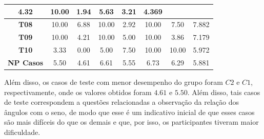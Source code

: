 \begin{table}[htbp]
\begin{tabular}{|c|ccccccc|}
		\multicolumn{1}{c|}{\cellcolor[HTML]{FFFFFF}4.32} &
		\multicolumn{1}{c|}{\cellcolor[HTML]{FFFFFF}10.00} &
		\multicolumn{1}{c|}{\cellcolor[HTML]{FFFFFF}1.94} &
		\multicolumn{1}{c|}{\cellcolor[HTML]{FFFFFF}5.63} &
		\multicolumn{1}{c|}{\cellcolor[HTML]{FFFFFF}3.21} &
		4.369 \\ \hline
		\rowcolor[HTML]{F2F2F2} 
		\textbf{T08} &
		\multicolumn{1}{c|}{\cellcolor[HTML]{F2F2F2}10.00} &
		\multicolumn{1}{c|}{\cellcolor[HTML]{F2F2F2}6.88} &
		\multicolumn{1}{c|}{\cellcolor[HTML]{F2F2F2}10.00} &
		\multicolumn{1}{c|}{\cellcolor[HTML]{F2F2F2}2.92} &
		\multicolumn{1}{c|}{\cellcolor[HTML]{F2F2F2}10.00} &
		\multicolumn{1}{c|}{\cellcolor[HTML]{F2F2F2}7.50} &
		7.882 \\ \hline
		\textbf{T09} &
		\multicolumn{1}{c|}{\cellcolor[HTML]{FFFFFF}10.00} &
		\multicolumn{1}{c|}{\cellcolor[HTML]{FFFFFF}4.21} &
		\multicolumn{1}{c|}{\cellcolor[HTML]{FFFFFF}10.00} &
		\multicolumn{1}{c|}{\cellcolor[HTML]{FFFFFF}5.00} &
		\multicolumn{1}{c|}{\cellcolor[HTML]{FFFFFF}10.00} &
		\multicolumn{1}{c|}{\cellcolor[HTML]{FFFFFF}3.86} &
		7.179 \\ \hline
		\rowcolor[HTML]{F2F2F2} 
		\textbf{T10} &
		\multicolumn{1}{c|}{\cellcolor[HTML]{F2F2F2}3.33} &
		\multicolumn{1}{c|}{\cellcolor[HTML]{F2F2F2}0.00} &
		\multicolumn{1}{c|}{\cellcolor[HTML]{F2F2F2}5.00} &
		\multicolumn{1}{c|}{\cellcolor[HTML]{F2F2F2}7.50} &
		\multicolumn{1}{c|}{\cellcolor[HTML]{F2F2F2}10.00} &
		\multicolumn{1}{c|}{\cellcolor[HTML]{F2F2F2}10.00} &
		5.972 \\ \hline
		\rowcolor[HTML]{D0CECE} 
		\textbf{NP Casos} &
		\multicolumn{1}{c|}{\cellcolor[HTML]{D0CECE}5.50} &
		\multicolumn{1}{c|}{\cellcolor[HTML]{D0CECE}4.61} &
		\multicolumn{1}{c|}{\cellcolor[HTML]{D0CECE}6.61} &
		\multicolumn{1}{c|}{\cellcolor[HTML]{D0CECE}5.55} &
		\multicolumn{1}{c|}{\cellcolor[HTML]{D0CECE}6.73} &
		\multicolumn{1}{c|}{\cellcolor[HTML]{D0CECE}6.29} &
		5.881 \\ \hline
	\end{tabular}
	\label{tab:F3_A3_NP_ESTUDO}
\end{table}

Além disso, os casos de teste com menor desempenho do grupo foram $C2$ e $C1$, respectivamente, onde os valores obtidos foram $4.61$ e $5.50$. Além disso, tais casos de teste correspondem a questões relacionadas a observação da relação dos ângulos com o seno, de modo que esse é um indicativo inicial de que esses casos são mais difíceis do que os demais e que, por isso, os participantes tiveram maior dificuldade.

